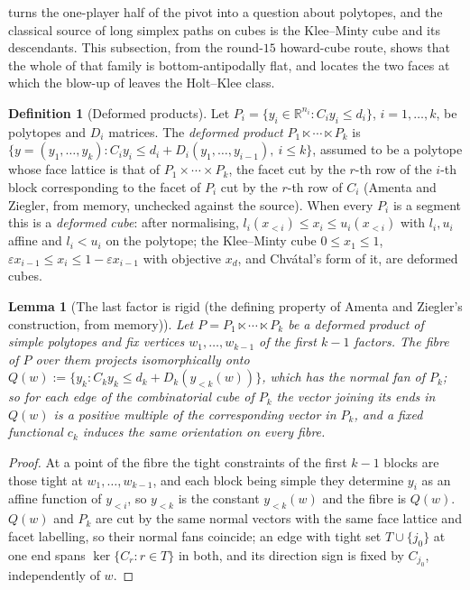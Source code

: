 \documentclass[11pt]{article}
\theoremstyle{plain}
\newtheorem{lemma}[theorem]{Lemma}
\theoremstyle{definition}
\newtheorem{definition}[theorem]{Definition}
\begin{document}
 turns the one-player half of the pivot into a
question about polytopes, and the classical source of long simplex paths
on cubes is the Klee--Minty cube and its descendants. This subsection,
from the round-$15$ howard-cube route, shows that the whole of that family
is bottom-antipodally flat, and locates the two faces at which the
blow-up of  leaves the Holt--Klee class.

\begin{definition}[Deformed products]\label{def:deformed}
Let $P_i=\{y_i\in\mathbb R^{n_i}:C_iy_i\le d_i\}$, $i=1,\dots,k$, be
polytopes and $D_i$ matrices. The \emph{deformed product}
$P_1\ltimes\cdots\ltimes P_k$ is
$\{y=(y_1,\dots,y_k):C_iy_i\le d_i+D_i(y_1,\dots,y_{i-1}),\ i\le k\}$,
assumed to be a polytope whose face lattice is that of
$P_1\times\cdots\times P_k$, the facet cut by the $r$-th row of the $i$-th
block corresponding to the facet of $P_i$ cut by the $r$-th row of $C_i$
(Amenta and Ziegler, from memory, unchecked against the source). When
every $P_i$ is a segment this is a \emph{deformed cube}: after
normalising, $l_i(x_{<i})\le x_i\le u_i(x_{<i})$ with $l_i,u_i$ affine and
$l_i<u_i$ on the polytope; the Klee--Minty cube
$0\le x_1\le1$, $\varepsilon x_{i-1}\le x_i\le1-\varepsilon x_{i-1}$ with
objective $x_d$, and Chv\'atal's form of it, are deformed cubes.
\end{definition}

\begin{lemma}[The last factor is rigid (the defining property of Amenta and Ziegler's construction, from memory)]\label{lem:deformed-rigid}
Let $P=P_1\ltimes\cdots\ltimes P_k$ be a deformed product of simple
polytopes and fix vertices $w_1,\dots,w_{k-1}$ of the first $k-1$ factors.
The fibre of $P$ over them projects isomorphically onto
$Q(w):=\{y_k:C_ky_k\le d_k+D_k(y_{<k}(w))\}$, which has the normal fan of
$P_k$; so for each edge of the combinatorial cube of $P_k$ the vector
joining its ends in $Q(w)$ is a positive multiple of the corresponding
vector in $P_k$, and a fixed functional $c_k$ induces the same
orientation on every fibre.
\end{lemma}

\begin{proof}
At a point of the fibre the tight constraints of the first $k-1$ blocks
are those tight at $w_1,\dots,w_{k-1}$, and each block being simple they
determine $y_i$ as an affine function of $y_{<i}$, so $y_{<k}$ is the
constant $y_{<k}(w)$ and the fibre is $Q(w)$. $Q(w)$ and $P_k$ are cut by
the same normal vectors with the same face lattice and facet labelling,
so their normal fans coincide; an edge with tight set $T\cup\{j_0\}$ at
one end spans $\ker\{C_r:r\in T\}$ in both, and its direction sign is
fixed by $C_{j_0}$, independently of $w$.
\end{proof}
\end{document}
